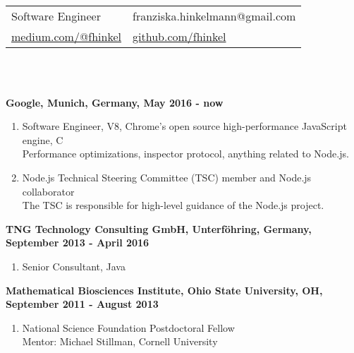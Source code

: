 \documentclass[10pt]{article}
\newcommand{\makeheading}[1]%
          {\hspace*{-\marginparsep minus \marginparwidth}%
           \begin{minipage}[t]{\textwidth+\marginparwidth+\marginparsep}%
                  {\large \bfseries #1}\\[-0.15\baselineskip]%
                   \rule{\columnwidth}{1pt}%
           \end{minipage}}
\renewcommand{\section}[2]%
          {\pagebreak[2]\vspace{1.3\baselineskip}%
           \phantomsection\addcontentsline{toc}{section}{#1}%
           \hspace{-.05in}%
  	\marginpar{\raggedright \scshape #1} #2}
\newenvironment{outerlist}[1][\enskip\textbullet]%
          {\begin{enumerate}[#1]}{\end{enumerate}%
           \vspace{-.6\baselineskip}}
\newcommand{\CC}{C\nolinebreak\hspace{-.05em}\raisebox{.4ex}{\tiny\bf +}\nolinebreak\hspace{-.10em}\raisebox{.4ex}{\tiny\bf +}}
\def\CC{{C\nolinebreak[4]\hspace{-.05em}\raisebox{.4ex}{\tiny\bf ++}}}
\begin{document}
  \newlength{\rcollength}\setlength{\rcollength}{2.5in}%
  \begin{tabular}[t]{@{}p{\textwidth-\rcollength}p{\rcollength}}
  Software Engineer & 
  	franziska.hinkelmann@gmail.com\\
  \href{https://medium.com/@fhinkel}{medium.com/@fhinkel}
  & 
      \href{https://github.com/fhinkel}{github.com/fhinkel}
  \end{tabular}\\

  \begin{tabular*}{\textwidth}{c}
  \hline
  \end{tabular*}
  
  \section{} 
    \textbf{Google, Munich, Germany, May 2016 - now}
  \begin{outerlist}
  	\item[]
  	{Software Engineer, V8, Chrome's open source high-performance JavaScript engine, \CC}\\
	Performance optimizations, inspector protocol, anything related to Node.js.
	\item[]
  	{Node.js Technical Steering Committee (TSC) member and Node.js collaborator}\\
	The TSC is responsible for high-level guidance of the Node.js project.\\
    \end{outerlist}
    
  \textbf{TNG Technology Consulting GmbH, Unterf\"ohring, Germany, September 2013 - April 2016}
  \begin{outerlist}
  	\item[]
  	{Senior Consultant, Java}\\
    \end{outerlist}

  \textbf{Mathematical Biosciences Institute, Ohio
  State University, OH, September 2011 - August 2013}
  \begin{outerlist}
  	\item[]
  	{National Science Foundation Postdoctoral Fellow}\\
  	Mentor: Michael Stillman, Cornell University
  	\\
  \end{outerlist}
  \begin{tabular*}{\textwidth}{c}
  \hline
  \end{tabular*}
\end{document}
